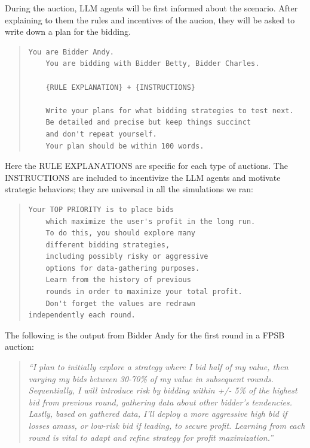\documentclass{article} %
\begin{document}
During the auction, LLM agents will be first informed about the scenario. After explaining to them the rules and incentives of the aucion, they will be asked to write down a plan for the bidding.
\begin{quote}
\begin{lstlisting}[basicstyle=\ttfamily]
    You are Bidder Andy.            
    You are bidding with Bidder Betty, Bidder Charles.     
    
    {RULE EXPLANATION} + {INSTRUCTIONS}

    Write your plans for what bidding strategies to test next. 
    Be detailed and precise but keep things succinct 
    and don't repeat yourself. 
    Your plan should be within 100 words.
\end{lstlisting}
\end{quote}

Here the RULE EXPLANATIONS are specific for each type of auctions. 
The INSTRUCTIONS are included to incentivize the LLM agents and motivate strategic behaviors; they are universal in all the simulations we ran:

\begin{quote}
\begin{lstlisting}[basicstyle=\ttfamily]
    Your TOP PRIORITY is to place bids 
    which maximize the user's profit in the long run. 
    To do this, you should explore many 
    different bidding strategies, 
    including possibly risky or aggressive
    options for data-gathering purposes. 
    Learn from the history of previous 
    rounds in order to maximize your total profit. 
    Don't forget the values are redrawn 
independently each round.
\end{lstlisting}
\end{quote}

The following is the output from Bidder Andy for the first round in a FPSB auction:
\begin{quote}
\textit{``I plan to initially explore a strategy where I bid half of my value, then varying my bids between 30-70\% of my value in subsequent rounds. Sequentially, I will introduce risk by bidding within +/- 5\% of the highest bid from previous round, gathering data about other bidder's tendencies. Lastly, based on gathered data, I'll deploy a more aggressive high bid if losses amass, or low-risk bid if leading, to secure profit. Learning from each round is vital to adapt and refine strategy for profit maximization.''}
\end{quote}
\end{document}
